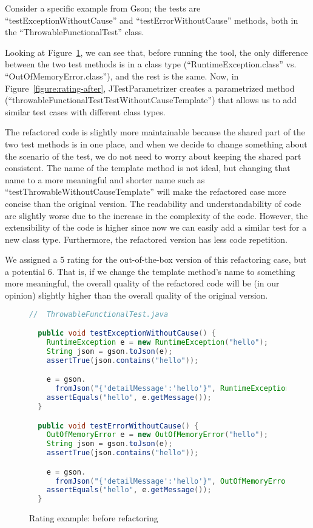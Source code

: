 Consider a specific example from Gson; the tests are ``testExceptionWithoutCause'' and ``testErrorWithoutCause'' methods, both in the ``ThrowableFunctionalTest'' class.

Looking at Figure~\ref{figure:rating-before}, we can see that, before running the tool, the only difference between the two test methods is in a class type (``RuntimeException.class'' vs. ``OutOfMemoryError.class''), and the rest is the same. Now, in Figure~\ref{figure:rating-after}, JTestParametrizer creates a parametrized method (``throwableFunctionalTestTestWithoutCauseTemplate'') that allows us to add similar test cases with different class types.

The refactored code is slightly more maintainable because the shared part of the two test methods is in one place, and when we decide to change something about the scenario of the test, we do not need to worry about keeping the shared part consistent.
The name of the template method is not ideal, but changing that name to a more meaningful and shorter name such as ``testThrowableWithoutCauseTemplate'' will make the refactored case more concise than the original version.
The readability and understandability of code are slightly worse due to the increase in the complexity of the code.
However, the extensibility of the code is higher since now we can easily add a similar test for a new class type. Furthermore, the refactored version has less code repetition.

We assigned a 5 rating for the out-of-the-box version of this refactoring case, but a potential 6. That is, if we change the template method's name to something more meaningful, the overall quality of the refactored code will be (in our opinion) slightly higher than the overall quality of the original version.

\begin{figure}
\begin{lstlisting}[language=Java]
  //  ThrowableFunctionalTest.java

  public void testExceptionWithoutCause() {
    RuntimeException e = new RuntimeException("hello");
    String json = gson.toJson(e);
    assertTrue(json.contains("hello"));

    e = gson.
      fromJson("{'detailMessage':'hello'}", RuntimeException.class);
    assertEquals("hello", e.getMessage());
  }

  public void testErrorWithoutCause() {
    OutOfMemoryError e = new OutOfMemoryError("hello");
    String json = gson.toJson(e);
    assertTrue(json.contains("hello"));

    e = gson.
      fromJson("{'detailMessage':'hello'}", OutOfMemoryError.class);
    assertEquals("hello", e.getMessage());
  }
\end{lstlisting}
\caption{Rating example: before refactoring}
\label{figure:rating-before}
\end{figure}

